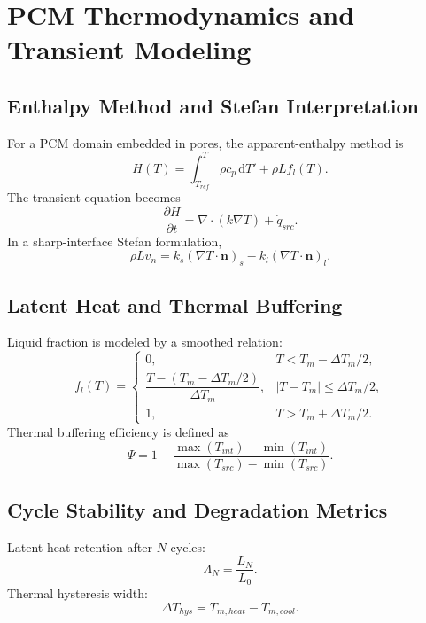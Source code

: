 \chapter{PCM Thermodynamics and Transient Modeling}\label{ch:pcm}

\section{Enthalpy Method and Stefan Interpretation}
For a PCM domain embedded in pores, the apparent-enthalpy method is
\begin{equation}\label{eq:enthalpy_def}
H(T)=\int_{T_{ref}}^{T}\rho c_p\,\mathrm{d}T'+\rho L f_l(T).
\end{equation}
The transient equation becomes
\begin{equation}\label{eq:enthalpy_pde}
\frac{\partial H}{\partial t}=\nabla\cdot\left(k\nabla T\right)+\dot{q}_{src}.
\end{equation}
In a sharp-interface Stefan formulation,
\begin{equation}\label{eq:stefan}
\rho L v_n = k_s\left(\nabla T\cdot\mathbf{n}\right)_s-k_l\left(\nabla T\cdot\mathbf{n}\right)_l.
\end{equation}

\section{Latent Heat and Thermal Buffering}
Liquid fraction is modeled by a smoothed relation:
\begin{equation}\label{eq:liquid_fraction}
f_l(T)=\begin{cases}
0, & T<T_m-\Delta T_m/2,\\
\dfrac{T-(T_m-\Delta T_m/2)}{\Delta T_m}, & |T-T_m|\le\Delta T_m/2,\\
1, & T>T_m+\Delta T_m/2.
\end{cases}
\end{equation}
Thermal buffering efficiency is defined as
\begin{equation}\label{eq:buffering}
\Psi=1-\frac{\max(T_{int})-\min(T_{int})}{\max(T_{src})-\min(T_{src})}.
\end{equation}

\section{Cycle Stability and Degradation Metrics}
Latent heat retention after $N$ cycles:
\begin{equation}\label{eq:latent_retention}
\Lambda_N=\frac{L_N}{L_0}.
\end{equation}
Thermal hysteresis width:
\begin{equation}\label{eq:hysteresis}
\Delta T_{hys}=T_{m,heat}-T_{m,cool}.
\end{equation}

